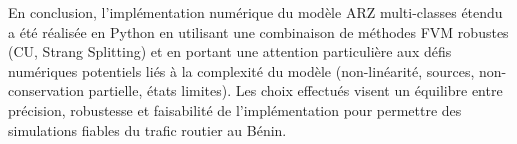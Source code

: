 En conclusion, l'implémentation numérique du modèle ARZ multi-classes étendu a été réalisée en Python en utilisant une combinaison de méthodes FVM robustes (CU, Strang Splitting) et en portant une attention particulière aux défis numériques potentiels liés à la complexité du modèle (non-linéarité, sources, non-conservation partielle, états limites). Les choix effectués visent un équilibre entre précision, robustesse et faisabilité de l'implémentation pour permettre des simulations fiables du trafic routier au Bénin.

